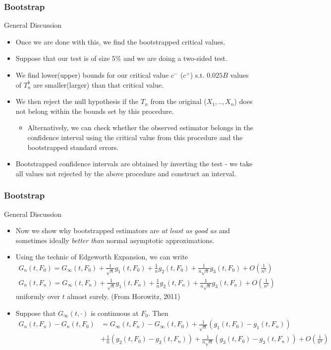 \documentclass{beamer}
\begin{document}
\begin{frame}
\frametitle{Bootstrap}
General Discussion
\begin{itemize}
\item Once we are done with this, we find the bootstrapped critical values. 
\item Suppose that our test is of size $5\%$ and we are doing a two-sided test.
\item  We find lower(upper) bounds for our critical value $c^-$ ($c^+$) s.t. $0.025B$ values of $T_n^b$ are smaller(larger) than that critical value. 
\item We then reject the null hypothesis if the $T_n$ from the original ($X_1,..,X_n$) does not belong within the bounds set by this procedure.
\begin{itemize}
\item Alternatively, we can check whether the observed estimator belongs in the confidence interval using the critical value from this procedure and the bootstrapped standard errors. 
\end{itemize}
\item Bootstrapped confidence intervals are obtained by inverting the test - we take all values not rejected by the above procedure and construct an interval.
\end{itemize}
\end{frame}

\begin{frame}
\frametitle{Bootstrap}
General Discussion
\begin{itemize}
\item Now we show why bootstrapped estimators are \textit{at least as good as} and sometimes ideally \textit{better than} normal asymptotic approximations. 
\item Using the technic of Edgeworth Expansion, we can write
\footnotesize{\begin{gather*}
G_n(t,F_0)=G_\infty(t,F_0) +\frac{1}{\sqrt{n}}g_1(t,F_0)+\frac{1}{n}g_2(t,F_0)+\frac{1}{n\sqrt{n}}g_3(t,F_0)+O\left(\frac{1}{n^2}\right)\\
G_n(t,F_n)=G_\infty(t,F_n) +\frac{1}{\sqrt{n}}g_1(t,F_n)+\frac{1}{n}g_2(t,F_n)+\frac{1}{n\sqrt{n}}g_3(t,F_n)+O\left(\frac{1}{n^2}\right)
\end{gather*}}\normalsize
uniformly over $t$ almost surely. (From Horowitz, 2011)
\item Suppose that $G_\infty(t,\cdot)$ is continuous at $F_0$. Then
\scriptsize{\begin{align*}
G_n(t,F_n)-G_n(t,F_0)&=G_\infty(t,F_n)-G_\infty(t,F_0)+\frac{1}{\sqrt{n}}(g_1(t,F_0)-g_1(t,F_n))\\
&+\frac{1}{n}(g_2(t,F_0)-g_2(t,F_n))+\frac{1}{n\sqrt{n}}(g_3(t,F_0)-g_3(t,F_n))+O\left( \frac{1}{n^2}\right)
\end{align*}}\normalsize
\end{itemize}
\end{frame}
\end{document}
